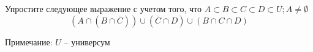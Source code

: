 \question
Упростите следующее выражение с учетом того, что $A\subset B \subset C \subset D \subset U; A \neq \emptyset$
\begin{equation*}
	(A \cap (B  \cap \overline{C})) \cup (\overline{C} \cap D) \cup (B \cap C \cap D)
\end{equation*}

Примечание: $U$ -- универсум